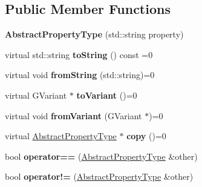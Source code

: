 \subsection*{Public Member Functions}
\begin{DoxyCompactItemize}
\item 
\hypertarget{classAbstractPropertyType_a2a525d57a943122e1cc709f738deb13e}{{\bfseries Abstract\-Property\-Type} (std\-::string property)}\label{classAbstractPropertyType_a2a525d57a943122e1cc709f738deb13e}

\item 
\hypertarget{classAbstractPropertyType_a4c359b2e7c3b0ede21c64ba2c90567aa}{virtual std\-::string {\bfseries to\-String} () const =0}\label{classAbstractPropertyType_a4c359b2e7c3b0ede21c64ba2c90567aa}

\item 
\hypertarget{classAbstractPropertyType_a9fae6e2ced72541b5e2bf321a1d193b0}{virtual void {\bfseries from\-String} (std\-::string)=0}\label{classAbstractPropertyType_a9fae6e2ced72541b5e2bf321a1d193b0}

\item 
\hypertarget{classAbstractPropertyType_ae4c8025e310eb06916a28e0341f3356d}{virtual G\-Variant $\ast$ {\bfseries to\-Variant} ()=0}\label{classAbstractPropertyType_ae4c8025e310eb06916a28e0341f3356d}

\item 
\hypertarget{classAbstractPropertyType_a3de5f842aa061f168438e67ca29c2685}{virtual void {\bfseries from\-Variant} (G\-Variant $\ast$)=0}\label{classAbstractPropertyType_a3de5f842aa061f168438e67ca29c2685}

\item 
\hypertarget{classAbstractPropertyType_a8fedd4300acc7ba7ada94e964f2fd166}{virtual \hyperlink{classAbstractPropertyType}{Abstract\-Property\-Type} $\ast$ {\bfseries copy} ()=0}\label{classAbstractPropertyType_a8fedd4300acc7ba7ada94e964f2fd166}

\item 
\hypertarget{classAbstractPropertyType_af156588f45c7b2f2107a8ebb8977e71f}{bool {\bfseries operator==} (\hyperlink{classAbstractPropertyType}{Abstract\-Property\-Type} \&other)}\label{classAbstractPropertyType_af156588f45c7b2f2107a8ebb8977e71f}

\item 
\hypertarget{classAbstractPropertyType_a137d170e61776d59cff141d2df7cab9b}{bool {\bfseries operator!=} (\hyperlink{classAbstractPropertyType}{Abstract\-Property\-Type} \&other)}\label{classAbstractPropertyType_a137d170e61776d59cff141d2df7cab9b}


\end{DoxyCompactItemize}

